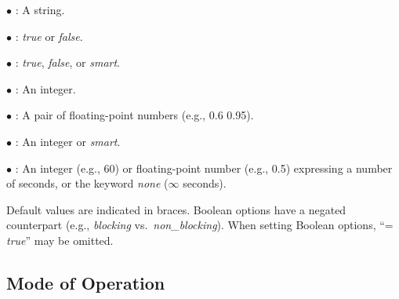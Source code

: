 \documentclass[a4paper,12pt]{article}
\begin{document}
\begin{enum}
\item[$\bullet$] : A string.
\item[$\bullet$] : \textit{true} or \textit{false}.
\item[$\bullet$] : \textit{true}, \textit{false}, or
\textit{smart}.
\item[$\bullet$] : An integer.
\item[$\bullet$] : A pair of floating-point numbers
(e.g., 0.6 0.95).
\item[$\bullet$] : An integer or \textit{smart}.
\item[$\bullet$] : An integer (e.g., 60) or
floating-point number (e.g., 0.5) expressing a number of seconds, or the keyword
\textit{none} ($\infty$ seconds).
\end{enum}

Default values are indicated in braces. Boolean options have a negated
counterpart (e.g., \textit{blocking} vs.\ \textit{non\_blocking}). When setting
Boolean options, ``= \textit{true}'' may be omitted.

\subsection{Mode of Operation}
\label{mode-of-operation}
\end{document}
